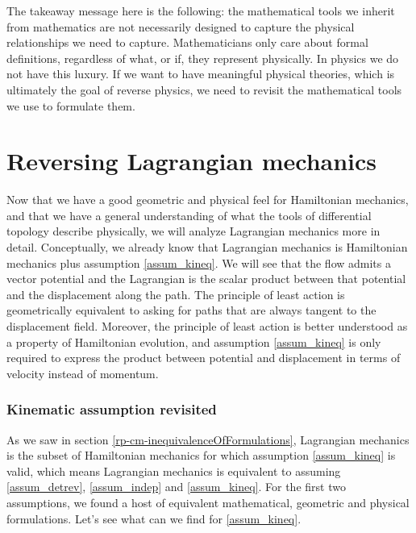 The takeaway message here is the following: the mathematical tools we inherit from mathematics are not necessarily designed to capture the physical relationships we need to capture. Mathematicians only care about formal definitions, regardless of what, or if, they represent physically. In physics we do not have this luxury. If we want to have meaningful physical theories, which is ultimately the goal of reverse physics, we need to revisit the mathematical tools we use to formulate them.


\section{Reversing Lagrangian mechanics}

Now that we have a good geometric and physical feel for Hamiltonian mechanics, and that we have a general understanding of what the tools of differential topology describe physically, we will analyze Lagrangian mechanics more in detail. Conceptually, we already know that Lagrangian mechanics is Hamiltonian mechanics plus assumption \ref{assum_kineq}. We will see that the flow admits a vector potential and the Lagrangian is the scalar product between that potential and the displacement along the path. The principle of least action is geometrically equivalent to asking for paths that are always tangent to the displacement field. Moreover, the principle of least action is better understood as a property of Hamiltonian evolution, and assumption \ref{assum_kineq} is only required to express the product between potential and displacement in terms of velocity instead of momentum.

\subsubsection{Kinematic assumption revisited}

As we saw in section \ref{rp-cm-inequivalenceOfFormulations}, Lagrangian mechanics is the subset of Hamiltonian mechanics for which assumption \ref{assum_kineq} is valid, which means Lagrangian mechanics is equivalent to assuming \ref{assum_detrev}, \ref{assum_indep} and \ref{assum_kineq}. For the first two assumptions, we found a host of equivalent mathematical, geometric and physical formulations. Let's see what can we find for \ref{assum_kineq}.

